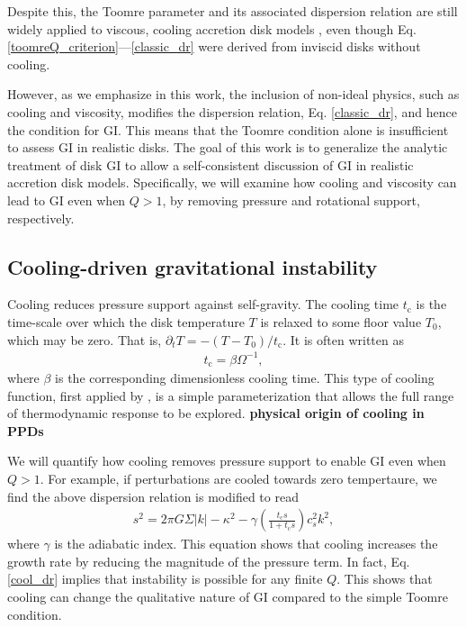 \documentclass[iop, numberedappendix]{emulateapj}
\newcommand{\p}{\partial}
\newcommand{\tcool}{t_\mathrm{c}}
\begin{document}
Despite this, the Toomre parameter and its associated
dispersion relation are still widely applied to viscous, cooling
accretion disk models \citep[e.g.][]{cossins09, kimura12}, 
even though Eq. \ref{toomreQ_criterion}---\ref{classic_dr} were 
derived from inviscid disks without cooling. 

However, as we emphasize in this work, the inclusion of non-ideal
physics, such as cooling and viscosity, modifies the dispersion
relation, Eq. \ref{classic_dr}, and hence the condition for GI. This 
means that the Toomre condition alone is insufficient to assess GI
in realistic disks. The goal of this work is to generalize the
analytic treatment of disk GI to allow a self-consistent discussion of
GI in realistic accretion disk models. Specifically, we will examine
how  cooling and viscosity can lead to GI even when $Q>1$, by 
removing pressure and rotational support, respectively. 


\subsection{Cooling-driven gravitational instability}\label{cool_gi}
Cooling reduces pressure support against self-gravity. The
cooling time  
$\tcool$ is the time-scale over which the disk temperature $T$ is relaxed
to some floor value $T_0$, which may be zero. That is, $\p_t T =
-(T-T_0)/\tcool$. It is often written as 
\begin{align} 
  \tcool = \beta \Omega^{-1},
\end{align}
where $\beta$ is the corresponding dimensionless cooling time. This
type of cooling function, first applied by \cite{gammie01}, is a
simple parameterization that allows the full range of thermodynamic
response to be explored. 
{\bf physical origin of cooling in PPDs}

We will quantify how cooling removes pressure support to enable GI
even when $Q>1$. For example, if perturbations are
cooled towards zero tempertaure, we find the above dispersion relation is
modified to read 
\begin{align}\label{cool_dr}
s^2 = 2\pi G\Sigma |k| - \kappa^2 - \gamma \left(\frac{\tcool s}{1 +
  \tcool s}\right)c_s^2k^2,
\end{align}
where $\gamma$ is the adiabatic index. This equation shows that
cooling increases the growth rate by reducing the magnitude of the
pressure term. In fact, Eq. \ref{cool_dr} implies that instability is
possible for any finite $Q$. %
This shows that cooling can change the
qualitative nature of GI compared to the simple Toomre condition.  
\end{document}
